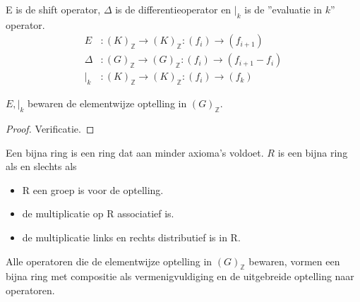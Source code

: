 \documentclass[a4paper,12pt]{article}
\begin{document}
\begin{definition}[$E , \Delta , |_k$]
    \label{defdiff}
    E is de shift operator, $\Delta$ is de differentieoperator en $|_k$ is de ''evaluatie in $k$'' operator.
    \begin{align*}
        E      & :(K)_{\mathbb{Z}} \rightarrow (K)_{\mathbb{Z}} : (f_i) \rightarrow (f_{i+1})       \\
        \Delta & :(G)_{\mathbb{Z}} \rightarrow (G)_{\mathbb{Z}} : (f_i) \rightarrow (f_{i+1}-f_{i}) \\
        |_k    & :(K)_{\mathbb{Z}} \rightarrow (K)_{\mathbb{Z}} : (f_i) \rightarrow (f_k)
    \end{align*}
\end{definition}


\begin{lemma}
    $E ,  |_k$ bewaren de elementwijze optelling in $(G)_{\mathbb{Z}}$.
\end{lemma}

\begin{proof}
    Verificatie.
\end{proof}

\begin{definition}
    Een bijna ring is een ring dat aan minder axioma's voldoet. $R$ is een bijna ring als en slechts als
    \begin{itemize}
        \item R een groep is voor de optelling.
        \item de multiplicatie op R associatief is.
        \item de multiplicatie links en rechts distributief is in R.
    \end{itemize}
\end{definition}

\begin{theorem}
    Alle operatoren die de elementwijze optelling in $(G)_{\mathbb{Z}}$ bewaren, vormen een bijna ring
    met compositie als vermenigvuldiging en de uitgebreide optelling naar operatoren.
\end{theorem}
\end{document}
